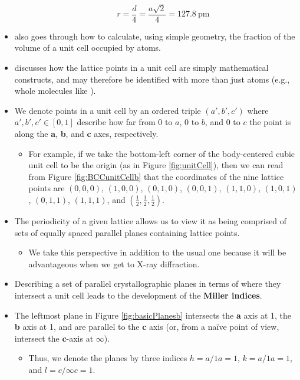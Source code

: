 \documentclass[../notes.tex]{subfiles}
\begin{document}
\begin{itemize}
\begin{itemize}
\begin{equation*}
            r = \frac{d}{4}
            = \frac{a\sqrt{2}}{4}
            = \SI{127.8}{\pico\meter}
        \end{equation*}
    \end{itemize}
    \item \textcite{bib:McQuarrieSimon} also goes through how to calculate, using simple geometry, the fraction of the volume of a unit cell occupied by atoms.
    \item \textcite{bib:McQuarrieSimon} discusses how the lattice points in a unit cell are simply mathematical constructs, and may therefore be identified with more than just atoms (e.g., whole molecules like ).
    \item We denote points in a unit cell by an ordered triple $(a',b',c')$ where $a',b',c'\in[0,1]$ describe how far from 0 to $a$, 0 to $b$, and 0 to $c$ the point is along the \textbf{a}, \textbf{b}, and \textbf{c} axes, respectively.
    \begin{itemize}
        \item For example, if we take the bottom-left corner of the body-centered cubic unit cell to be the origin (as in Figure \ref{fig:unitCell}), then we can read from Figure \ref{fig:BCCunitCellb} that the coordinates of the nine lattice points are $(0,0,0)$, $(1,0,0)$, $(0,1,0)$, $(0,0,1)$, $(1,1,0)$, $(1,0,1)$, $(0,1,1)$, $(1,1,1)$, and $(\frac{1}{2},\frac{1}{2},\frac{1}{2})$.
    \end{itemize}
    \item The periodicity of a given lattice allows us to view it as being comprised of sets of equally spaced parallel planes containing lattice points.
    \begin{itemize}
        \item We take this perspective in addition to the usual one because it will be advantageous when we get to X-ray diffraction.
    \end{itemize}
    \item Describing a set of parallel crystallographic planes in terms of where they intersect a unit cell leads to the development of the \textbf{Miller indices}.
    \item The leftmost plane in Figure \ref{fig:basicPlanesb} intersects the \textbf{a} axis at 1, the \textbf{b} axis at 1, and are parallel to the \textbf{c} axis (or, from a na\"{i}ve point of view, intersect the \textbf{c}-axis at $\infty$).
    \begin{itemize}
        \item Thus, we denote the planes by three indices $h=a/1a=1$, $k=a/1a=1$, and $l=c/\infty c=1$.

\end{itemize}
\end{itemize}
\end{document}
